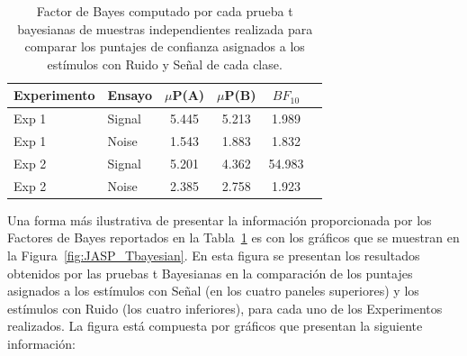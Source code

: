 \begin{table}
\caption[Prueba t bayesiana para evaluar las diferencias entre las medias de los puntajes de confianza asigandos a los estímulos con señal y ruido de cada clase]{Factor de Bayes computado por cada prueba t bayesianas de muestras independientes realizada para comparar los puntajes de confianza asignados a los estímulos con Ruido y Señal de cada clase.}
\label{Tabla_t-Bayesian}
\centering
\begin{tabular}{l l |  c c c c}
\toprule
\textbf{Experimento} & \textbf{Ensayo} & \textbf{$\mu$P(A)} & \textbf{$\mu$P(B)} & \textbf{$BF_{10}$} \\
\midrule
Exp 1 & Signal & 5.445 & 5.213 & 1.989 \\
Exp 1 & Noise & 1.543 & 1.883 & 1.832 \\
Exp 2 & Signal & 5.201 & 4.362  & 54.983 \\
Exp 2 & Noise & 2.385 & 2.758 & 1.923 \\
\bottomrule
\end{tabular}
\end{table}

Una forma más ilustrativa de presentar la información proporcionada por los Factores de Bayes reportados en la Tabla~\ref{Tabla_t-Bayesian} es con los gráficos que se muestran en la Figura~\ref{fig:JASP_Tbayesian}. En esta figura se presentan los resultados obtenidos por las pruebas t Bayesianas en la comparación de los puntajes asignados a los estímulos con Señal (en los cuatro paneles superiores) y los estímulos con Ruido (los cuatro inferiores), para cada uno de los Experimentos realizados. La figura está compuesta por gráficos que presentan la siguiente información:\\

